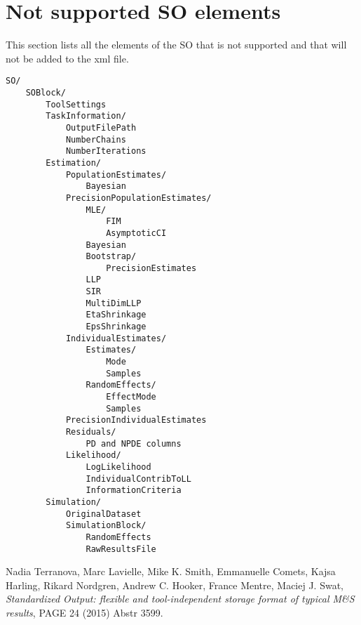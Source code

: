\section{Not supported SO elements}

This section lists all the elements of the SO that is not supported and that will not be added to the xml file.

\begin{verbatim}
SO/
    SOBlock/
        ToolSettings
        TaskInformation/
            OutputFilePath
            NumberChains
            NumberIterations
        Estimation/
            PopulationEstimates/
                Bayesian
            PrecisionPopulationEstimates/
                MLE/
                    FIM
                    AsymptoticCI
                Bayesian
                Bootstrap/
                    PrecisionEstimates
                LLP
                SIR
                MultiDimLLP
                EtaShrinkage
                EpsShrinkage
            IndividualEstimates/
                Estimates/
                    Mode
                    Samples
                RandomEffects/
                    EffectMode
                    Samples
            PrecisionIndividualEstimates
            Residuals/
                PD and NPDE columns
            Likelihood/
                LogLikelihood
                IndividualContribToLL
                InformationCriteria
        Simulation/
            OriginalDataset
            SimulationBlock/
                RandomEffects
                RawResultsFile
\end{verbatim}

\begin{thebibliography}{1}
 Nadia Terranova, Marc Lavielle, Mike K. Smith, 
Emmanuelle Comets, Kajsa Harling, Rikard Nordgren, Andrew C. Hooker, 
France Mentre, Maciej J. Swat,
{\em Standardized Output: flexible and tool-independent storage 
format of typical M\&S results}, PAGE 24 (2015) Abstr 3599.
\end{thebibliography}


